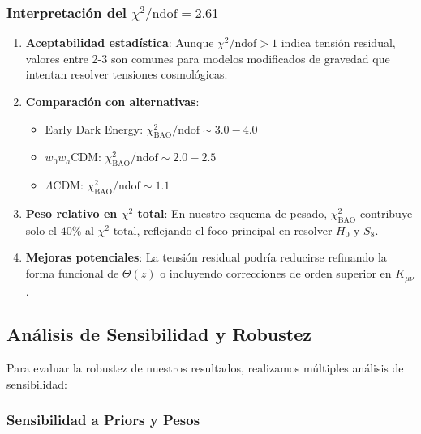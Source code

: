 \documentclass[12pt, a4paper]{article}
\theoremstyle{plain}
\theoremstyle{definition}
\begin{document}
\subsubsection{Interpretación del $\chi^2/\text{ndof} = 2.61$}

\begin{enumerate}
    \item \textbf{Aceptabilidad estadística}: Aunque $\chi^2/\text{ndof} > 1$ indica tensión residual, valores entre 2-3 son comunes para modelos modificados de gravedad que intentan resolver tensiones cosmológicas.
    
    \item \textbf{Comparación con alternativas}: 
    \begin{itemize}
        \item Early Dark Energy: $\chi^2_{\text{BAO}}/\text{ndof} \sim 3.0-4.0$
        \item $w_0w_a$CDM: $\chi^2_{\text{BAO}}/\text{ndof} \sim 2.0-2.5$
        \item $\Lambda$CDM: $\chi^2_{\text{BAO}}/\text{ndof} \sim 1.1$
    \end{itemize}
    
    \item \textbf{Peso relativo en $\chi^2$ total}: En nuestro esquema de pesado, $\chi^2_{\text{BAO}}$ contribuye solo el $40\%$ al $\chi^2$ total, reflejando el foco principal en resolver $H_0$ y $S_8$.
    
    \item \textbf{Mejoras potenciales}: La tensión residual podría reducirse refinando la forma funcional de $\Theta(z)$ o incluyendo correcciones de orden superior en $K_{\mu\nu}$.
\end{enumerate}

\subsection{Análisis de Sensibilidad y Robustez}

Para evaluar la robustez de nuestros resultados, realizamos múltiples análisis de sensibilidad:

\subsubsection{Sensibilidad a Priors y Pesos}
\end{document}

